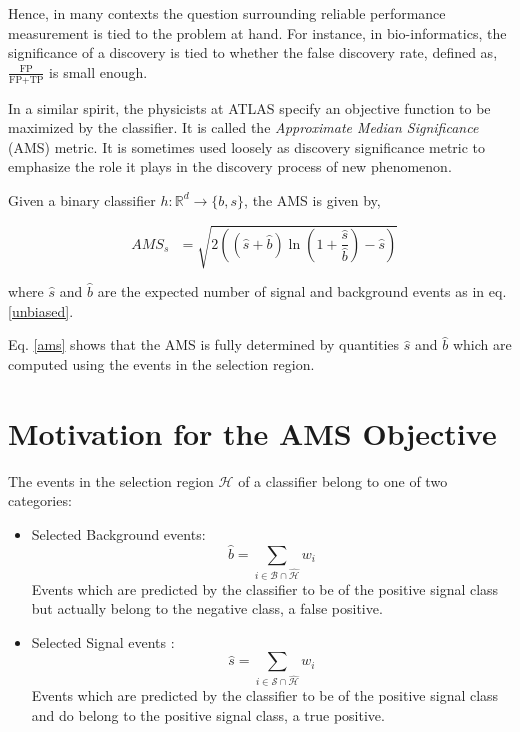 Hence, in many contexts the question surrounding reliable performance measurement is tied to the problem at hand. For instance, in bio-informatics, the significance of a discovery is tied to whether the false discovery rate, defined as, $\frac{\displaystyle \text{FP}}{\displaystyle \text{FP+TP}}$ is small enough. 

In a similar spirit, the physicists at ATLAS specify an objective function to be maximized by the classifier. It is called the \textit{Approximate Median Significance} (AMS) metric. It is sometimes used loosely as discovery significance metric to emphasize the role it plays in the discovery process of new phenomenon. 

Given a binary classifier $h : \mathbb{R}^{d} \rightarrow \{b,s\}$, the AMS is given by, 

\begin{equation}
\textrm{ $AMS_{s}$ } = \sqrt{2((\hat{s} + \hat{b})\ln(1 + \frac{\hat{s}}{\hat{b}})-\hat{s})} 
\label{ams} 
\end{equation}
\raisetag{-.4em}

where $\hat{s}$ and $\hat{b}$ are the expected number of signal and background events as in eq. \ref{unbiased}.

Eq. \ref{ams} shows that the AMS is fully determined by quantities $\hat{s}$ and $\hat{b}$ which are computed using the events in the selection region. 

\section{Motivation for the AMS Objective}
\label{motivationams}

The events in the selection region $\mathcal{H}$ of a classifier belong to one of two categories:

\begin{itemize}
\item{Selected Background events: 
\begin{equation*} 
\hat{b} =\sum_{i \in \mathcal{B}\cap\hat{\mathcal{H}}} w_{i} 
\label{unbiasedB}
\end{equation*} 
Events which are predicted by the classifier to be of the positive signal class but actually belong to the negative class, a false positive.}
\item{Selected Signal events : 
\begin{equation*} 
\hat{s}=\sum_{i \in \mathcal{S}\cap\hat{\mathcal{H}}} w_{i} 
\label{unbiasedS}
\end{equation*} 
Events which are predicted by the classifier to be of the positive signal class and do belong to the positive signal class, a true positive.}
\end{itemize}

